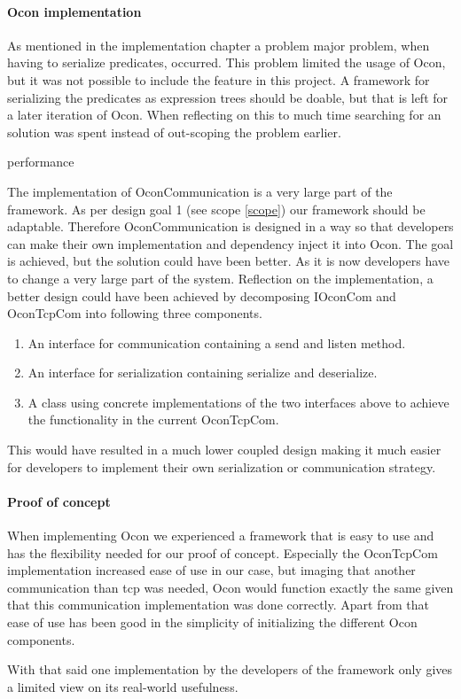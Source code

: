 \documentclass[../report.tex]{subfiles}
\begin{document}
\graphicspath{{img/}{../img/}}


\paragraph{Ocon implementation}
As mentioned in the implementation chapter a problem major problem, when having to serialize predicates, occurred. This problem limited the usage of Ocon, but it was not possible to include the feature in this project. A framework for serializing the predicates as expression trees should be doable, but that is left for a later iteration of Ocon. When reflecting on this to much time searching for an solution was spent instead of out-scoping the problem earlier. 

performance

The implementation of OconCommunication is a very large part of the framework. As per design goal 1 (see scope  \ref{scope}) our framework should be adaptable. Therefore OconCommunication is designed in a way so that developers can make their own implementation and dependency inject it into Ocon. The goal is achieved, but the solution could have been better. As it is now developers have to change a very large part of the system. Reflection on the implementation, a better design could have been achieved by decomposing IOconCom and OconTcpCom into following three components.

\begin{enumerate}
\item An interface for communication containing a send and listen method.
\item An interface for serialization containing serialize and deserialize.
\item A class using concrete implementations of the two interfaces above to achieve the functionality in the current OconTcpCom.
\end{enumerate}

This would have resulted in a much lower coupled design making it much easier for developers to implement their own serialization or communication strategy.

\paragraph{Proof of concept}
When implementing Ocon we experienced a framework that is easy to use and has the flexibility needed for our proof of concept. Especially the OconTcpCom implementation increased ease of use in our case, but imaging that another communication than tcp was needed, Ocon would function exactly the same given that this communication implementation was done correctly. Apart from that ease of use has been good in the simplicity of initializing the different Ocon components.

With that said one implementation by the developers of the framework only gives a limited view on its real-world usefulness.
\end{document}
